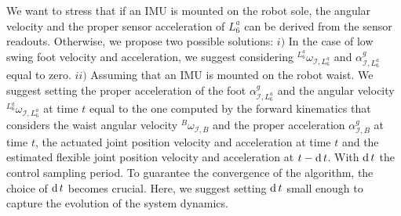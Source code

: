 \par
We want to stress that if an IMU is mounted on the robot sole, the angular velocity and the proper
sensor acceleration of $L^{a}_{6}$ can be derived from the sensor readouts. Otherwise, we propose
two possible solutions: $i)$ In the case of low swing foot velocity and acceleration, we suggest considering ${}^{L^{a}_{6}} \omega _{\mathcal{I}, L^{a}_{6}}$ and $\alpha ^ g _
{\mathcal{I},L^{a}_{6}}$ equal to zero.  $ii)$ Assuming that an IMU is mounted on the robot
waist. We suggest setting the proper acceleration of the foot $\alpha ^ g _ {\mathcal{I},L^{a}_{6}}$ and the
angular velocity ${}^{L^{a}_{6}} \omega _{\mathcal{I}, L^{a}_{6}}$ at time $t$ equal to the one
computed by the forward kinematics that considers the waist angular velocity ${}^{B} \omega
_{\mathcal{I}, B}$ and the proper acceleration $ \alpha _ {\mathcal{I},B}^g$ at time $t$, the actuated
joint position velocity and acceleration at time $t$ and the estimated flexible joint position
velocity and acceleration at $t - \operatorname{d} t$. With $\operatorname{d} t$ the control sampling period. To guarantee
the convergence of the algorithm, the choice of $\operatorname{d} t$ becomes crucial. Here, we suggest setting
$\operatorname{d} t$ small enough to capture the evolution of the system dynamics.

